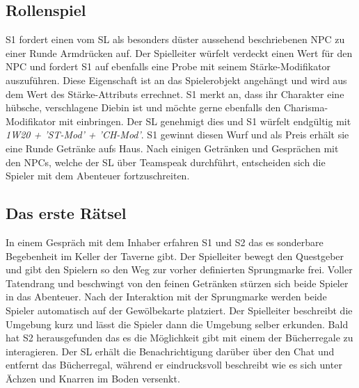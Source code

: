 \subsection{Rollenspiel}
\label{sec:Rollenspiel}

S1 fordert einen vom SL als besonders düster aussehend beschriebenen NPC zu einer Runde Armdrücken auf.\newline
Der Spielleiter würfelt verdeckt einen Wert für den NPC und fordert S1 auf ebenfalls eine Probe mit seinem Stärke-Modifikator auszuführen. Diese Eigenschaft ist an das Spielerobjekt angehängt und wird aus dem Wert des Stärke-Attributs errechnet. S1 merkt an, dass ihr Charakter eine hübsche, verschlagene Diebin ist und möchte gerne ebenfalls den Charisma-Modifikator mit einbringen. Der SL genehmigt dies und S1 würfelt endgültig mit \emph{1W20 + 'ST-Mod' + 'CH-Mod'}. S1 gewinnt diesen Wurf und als Preis erhält sie eine Runde Getränke aufs Haus.\newline
Nach einigen Getränken und Gesprächen mit den NPCs, welche der SL über Teamspeak durchführt, entscheiden sich die Spieler mit dem Abenteuer fortzuschreiten. 

\subsection{Das erste Rätsel}
\label{sec:DasErsteRätsel}

\begin{center}\end{center}
In einem Gespräch mit dem Inhaber erfahren S1 und S2 das es sonderbare Begebenheit im Keller der Taverne gibt. Der Spielleiter bewegt den Questgeber und gibt den Spielern so den Weg zur vorher definierten Sprungmarke frei.\newline
Voller Tatendrang und beschwingt von den feinen Getränken stürzen sich beide Spieler in das Abenteuer.
Nach der Interaktion mit der Sprungmarke werden beide Spieler automatisch auf der Gewölbekarte platziert. Der Spielleiter beschreibt die Umgebung kurz und lässt die Spieler dann die Umgebung selber erkunden. Bald hat S2 herausgefunden das es die Möglichkeit gibt mit einem der Bücherregale zu interagieren. Der SL erhält die Benachrichtigung darüber über den Chat und entfernt das Bücherregal, während er eindrucksvoll beschreibt wie es sich unter Ächzen und Knarren im Boden versenkt.\newline


